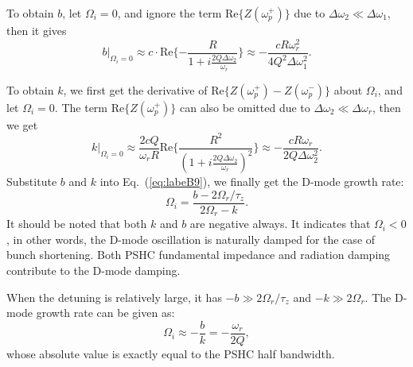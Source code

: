 \documentclass[%
 reprint,
 amsmath,amssymb,
 aps,
]{revtex4-1}
\begin{document}
To obtain $b$, let $\Omega_i=0$, and ignore the term $\mathrm {Re}\{Z(\omega^{+}_p)\}$ due to $\Delta\omega_2 \ll \Delta\omega_1$, then it gives
\begin{equation}\label{eq:labeB11}
   b|_{\Omega_i=0}\approx c \cdot \mathrm {Re} \{-\frac{R}{1+i\frac{2Q\Delta\omega_2}{\omega_r}}\} \approx -\frac{cR\omega^2_r}{4Q^2\Delta\omega^2_1}.
\end{equation}

To obtain $k$, we first get the derivative of $\mathrm {Re}\{Z(\omega^{+}_p)-Z(\omega^{-}_p)\}$ about $\Omega_i$, and let $\Omega_i=0$. The term $\mathrm {Re}\{Z(\omega^{+}_p)\}$ can also be omitted due to $\Delta\omega_2 \ll \Delta\omega_r$, then we get
\begin{equation}\label{eq:labeB12}
   k|_{\Omega_i=0}\approx \frac{2cQ}{\omega_r R} \mathrm {Re} \{\frac{R^2}{(1+i\frac{2Q\Delta\omega_2}{\omega_r})^2}\} \approx -\frac{cR\omega_r}{2Q \Delta\omega^2_2}.
\end{equation}
Substitute $b$ and $k$ into Eq.~(\ref{eq:labeB9}), we finally get the D-mode growth rate:
\begin{equation}\label{eq:labeB13}
   \Omega_i=\frac{b-2\Omega_r/\tau_z}{2\Omega_r-k}.
\end{equation}
It should be noted that both $k$ and $b$ are negative always. It indicates that $\Omega_i<0$, in other words, the D-mode oscillation is naturally damped for the case of bunch shortening. Both PSHC fundamental impedance and radiation damping contribute to the D-mode damping. 

When the detuning is relatively large, it has $-b\gg 2\Omega_r/\tau_z$  and $-k\gg 2\Omega_r$. The D-mode growth rate can be given as:
\begin{equation}\label{eq:labeB14}
   \Omega_i \approx -\frac{b}{k}=-\frac{\omega_r}{2Q},
\end{equation}
whose absolute value is exactly equal to the PSHC half bandwidth.

\nocite{*}
\end{document}
